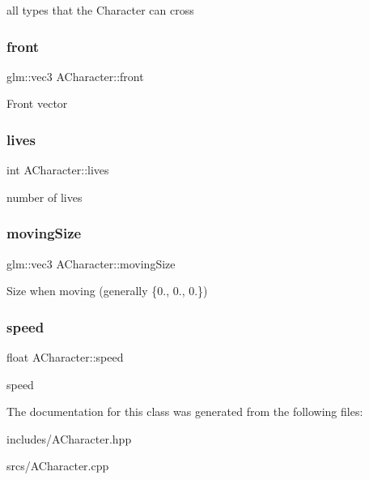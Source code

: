 all types that the Character can cross \mbox{\label{class_a_character_af8466a49b0a5abcc22a785562aed7257}} 
\subsubsection{\texorpdfstring{front}{front}}
{\footnotesize\ttfamily glm\+::vec3 A\+Character\+::front}

Front vector \mbox{\label{class_a_character_a46261a6f692a2b826ca0f30ccbdf93da}} 
\subsubsection{\texorpdfstring{lives}{lives}}
{\footnotesize\ttfamily int A\+Character\+::lives}

number of lives \mbox{\label{class_a_character_ab91ce66f359d4c3fb605948689f4fd20}} 
\subsubsection{\texorpdfstring{moving\+Size}{movingSize}}
{\footnotesize\ttfamily glm\+::vec3 A\+Character\+::moving\+Size}

Size when moving (generally \{0., 0., 0.\}) \mbox{\label{class_a_character_a078f65a8d5565962c2f17f44f19eef66}} 
\subsubsection{\texorpdfstring{speed}{speed}}
{\footnotesize\ttfamily float A\+Character\+::speed}

speed 

The documentation for this class was generated from the following files\+:\begin{DoxyCompactItemize}
\item 
includes/A\+Character.\+hpp\item 
srcs/A\+Character.\+cpp\end{DoxyCompactItemize}
